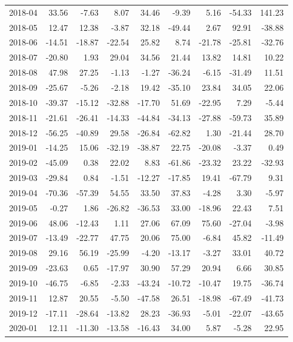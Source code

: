\begin{table}[ht]
\begin{tabular}{lrrrrrrrr}
  2018-04 & 33.56 & -7.63 & 8.07 & 34.46 & -9.39 & 5.16 & -54.33 & 141.23 \\ 
  2018-05 & 12.47 & 12.38 & -3.87 & 32.18 & -49.44 & 2.67 & 92.91 & -38.88 \\ 
  2018-06 & -14.51 & -18.87 & -22.54 & 25.82 & 8.74 & -21.78 & -25.81 & -32.76 \\ 
  2018-07 & -20.80 & 1.93 & 29.04 & 34.56 & 21.44 & 13.82 & 14.81 & 10.22 \\ 
  2018-08 & 47.98 & 27.25 & -1.13 & -1.27 & -36.24 & -6.15 & -31.49 & 11.51 \\ 
  2018-09 & -25.67 & -5.26 & -2.18 & 19.42 & -35.10 & 23.84 & 34.05 & 22.06 \\ 
  2018-10 & -39.37 & -15.12 & -32.88 & -17.70 & 51.69 & -22.95 & 7.29 & -5.44 \\ 
  2018-11 & -21.61 & -26.41 & -14.33 & -44.84 & -34.13 & -27.88 & -59.73 & 35.89 \\ 
  2018-12 & -56.25 & -40.89 & 29.58 & -26.84 & -62.82 & 1.30 & -21.44 & 28.70 \\ 
  2019-01 & -14.25 & 15.06 & -32.19 & -38.87 & 22.75 & -20.08 & -3.37 & 0.49 \\ 
  2019-02 & -45.09 & 0.38 & 22.02 & 8.83 & -61.86 & -23.32 & 23.22 & -32.93 \\ 
  2019-03 & -29.84 & 0.84 & -1.51 & -12.27 & -17.85 & 19.41 & -67.79 & 9.31 \\ 
  2019-04 & -70.36 & -57.39 & 54.55 & 33.50 & 37.83 & -4.28 & 3.30 & -5.97 \\ 
  2019-05 & -0.27 & 1.86 & -26.82 & -36.53 & 33.00 & -18.96 & 22.43 & 7.51 \\ 
  2019-06 & 48.06 & -12.43 & 1.11 & 27.06 & 67.09 & 75.60 & -27.04 & -3.98 \\ 
  2019-07 & -13.49 & -22.77 & 47.75 & 20.06 & 75.00 & -6.84 & 45.82 & -11.49 \\ 
  2019-08 & 29.16 & 56.19 & -25.99 & -4.20 & -13.17 & -3.27 & 33.01 & 40.72 \\ 
  2019-09 & -23.63 & 0.65 & -17.97 & 30.90 & 57.29 & 20.94 & 6.66 & 30.85 \\ 
  2019-10 & -46.75 & -6.85 & -2.33 & -43.24 & -10.72 & -10.47 & 19.75 & -36.74 \\ 
  2019-11 & 12.87 & 20.55 & -5.50 & -47.58 & 26.51 & -18.98 & -67.49 & -41.73 \\ 
  2019-12 & -17.11 & -28.64 & -13.82 & 28.23 & -36.93 & -5.01 & -22.07 & -43.65 \\ 
  2020-01 & 12.11 & -11.30 & -13.58 & -16.43 & 34.00 & 5.87 & -5.28 & 22.95 \\ 

\end{tabular}
\end{table}
